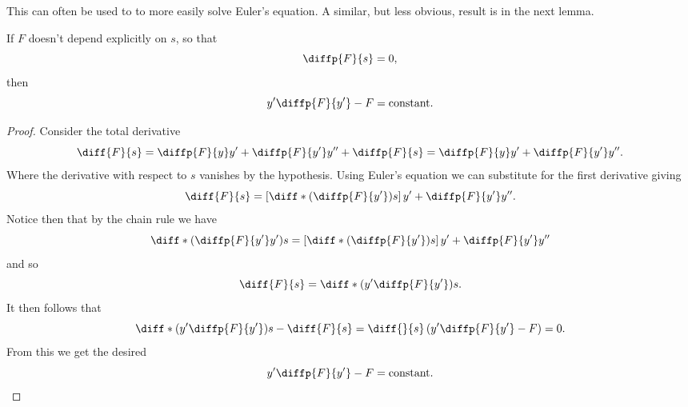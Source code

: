 \documentclass[fleqn]{NotesClass}
\begin{document}
    This can often be used to to more easily solve Euler's equation.
    A similar, but less obvious, result is in the next lemma.
    
    \begin{lma}{}{}
        If \(F\) doesn't depend explicitly on \(s\), so that
        \begin{equation}
            \diffp{F}{s} = 0,
        \end{equation}
        then
        \begin{equation}
            y' \diffp{F}{y'} - F = \text{constant.}
        \end{equation}
        \begin{proof}
            Consider the total derivative
            \begin{equation}
                \diff{F}{s} = \diffp{F}{y}y' + \diffp{F}{y'}y'' + \diffp{F}{s} = \diffp{F}{y}y' + \diffp{F}{y'}y''.
            \end{equation}
            Where the derivative with respect to \(s\) vanishes by the hypothesis.
            Using Euler's equation we can substitute for the first derivative giving
            \begin{equation}
                \diff{F}{s} = \left[ \diff*{\left( \diffp{F}{y'} \right)}{s} \right]y' + \diffp{F}{y'}y''.
            \end{equation}
            Notice then that by the chain rule we have
            \begin{equation}
                \diff*{\left( \diffp{F}{y'}y' \right)}{s} = \left[ \diff*{\left( \diffp{F}{y'} \right)}{s} \right]y' + \diffp{F}{y'}y''
            \end{equation}
            and so
            \begin{equation}
                \diff{F}{s} = \diff*{\left( y'\diffp{F}{y'} \right)}{s}.
            \end{equation}
            It then follows that
            \begin{equation}
                \diff*{\left( y'\diffp{F}{y'} \right)}{s} - \diff{F}{s} = \diff{}{s}\left( y'\diffp{F}{y'} - F \right) = 0.
            \end{equation}
            From this we get the desired
            \begin{equation}
                y'\diffp{F}{y'} - F = \text{constant.}
            \end{equation}
        \end{proof}
    \end{lma}
    
\end{document}

